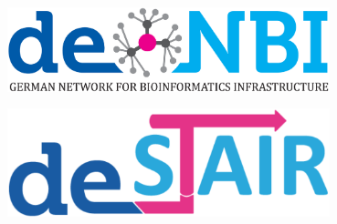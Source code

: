 \documentclass[xcolor=dvipsnames]{beamer}
\begin{document}
\begin{frame}
\begin{columns}
\begin{column}{0.5\textwidth}
\begin{center}
      \end{center}
      \vspace{0.2cm}
      \begin{center}
        \includegraphics[width=0.70\textwidth]{images/logo_denbi}
      \end{center}
      \begin{center}
        \includegraphics[width=0.70\textwidth]{images/logo_destair}
      \end{center}
    \end{column}
  \end{columns}
\end{frame}
\end{document}
